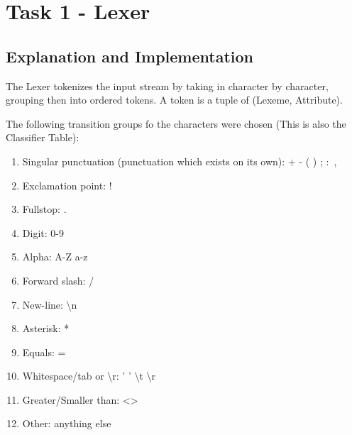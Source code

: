 \section{Task 1 - Lexer}
\subsection{Explanation and Implementation}
The Lexer tokenizes the input stream by taking in character by character, grouping then into ordered tokens. A token is a tuple of (Lexeme, Attribute).

The following transition groups fo the characters were chosen (This is also the Classifier Table):
\begin{enumerate}
	\item Singular punctuation (punctuation which exists on its own): + - ( ) \textbraceleft \textbraceright ; $\colon$ ,
	\item Exclamation point: !
	\item Fullstop: .
	\item Digit: 0-9
	\item Alpha: A-Z a-z \textunderscore
	\item Forward slash: /
	\item New-line: \textbackslash n
	\item Asterisk: *
	\item Equals: =
	\item Whitespace/tab or \textbackslash r: ' ' \textbackslash t \textbackslash r
	\item Greater/Smaller than: \textless  \textgreater
	\item Other: anything else
\end{enumerate}

